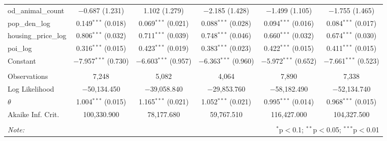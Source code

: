 \begin{table}[!htbp]
\begin{tabular}{@{\extracolsep{1pt}}lccccc}
  od\_animal\_count & $-$0.687 (1.231) & 1.102 (1.279) & $-$2.185 (1.428) & $-$1.499 (1.105) & $-$1.755 (1.465) \\ 
  pop\_den\_log & 0.149$^{***}$ (0.018) & 0.069$^{***}$ (0.021) & 0.088$^{***}$ (0.028) & 0.094$^{***}$ (0.016) & 0.084$^{***}$ (0.017) \\ 
  housing\_price\_log & 0.806$^{***}$ (0.032) & 0.711$^{***}$ (0.039) & 0.748$^{***}$ (0.046) & 0.660$^{***}$ (0.032) & 0.674$^{***}$ (0.030) \\ 
  poi\_log & 0.316$^{***}$ (0.015) & 0.423$^{***}$ (0.019) & 0.383$^{***}$ (0.023) & 0.422$^{***}$ (0.015) & 0.411$^{***}$ (0.015) \\ 
  Constant & $-$7.957$^{***}$ (0.730) & $-$6.603$^{***}$ (0.957) & $-$6.363$^{***}$ (0.960) & $-$5.972$^{***}$ (0.652) & $-$7.661$^{***}$ (0.523) \\ 
 \hline \\[-1.8ex] 
Observations & 7,248 & 5,082 & 4,064 & 7,890 & 7,338 \\ 
Log Likelihood & $-$50,134.450 & $-$39,058.840 & $-$29,853.760 & $-$58,182.490 & $-$52,134.740 \\ 
$\theta$ & 1.004$^{***}$  (0.015) & 1.165$^{***}$  (0.021) & 1.052$^{***}$  (0.021) & 0.995$^{***}$  (0.014) & 0.968$^{***}$  (0.015) \\ 
Akaike Inf. Crit. & 100,330.900 & 78,177.680 & 59,767.510 & 116,427.000 & 104,327.500 \\ 
\hline 
\hline \\[-1.8ex] 
\textit{Note:}  & \multicolumn{5}{r}{$^{*}$p$<$0.1; $^{**}$p$<$0.05; $^{***}$p$<$0.01} \\ 
\end{tabular} 
\end{table} 
